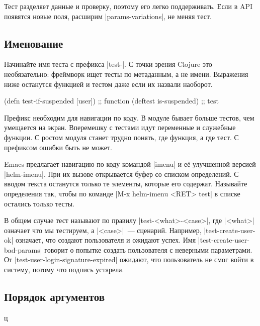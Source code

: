 Тест разделяет данные и проверку, поэтому его легко поддерживать. Если в API
появятся новые поля, расширим \spverb|params-variations|, не меняя тест.

\subsection{Именование}


Начинайте имя теста с префикса \spverb|test-|. С точки зрения Clojure это
необязательно: фреймворк ищет тесты по метаданным, а не имени. Выражения ниже
останутся функцией и тестом даже если их назвали наоборот.

\begin{english}
  \begin{clojure}
(defn test-if-suspended [user]) ;; function
(deftest is-suspended)          ;; test
  \end{clojure}
\end{english}

Префикс необходим для навигации по коду. В модуле бывает больше тестов, чем
умещается на экран. Вперемешку с тестами идут переменные и служебные функции. С
ростом модуля станет трудно понять, где функция, а где тест. С префиксом ошибки
быть не может.


Emacs предлагает навигацию по коду командой \spverb|imenu| и е\"{е} улучшенной
версией \spverb|helm-imenu|. При их вызове открывается буфер со списком
определений. С вводом текста останутся только те элементы, которые его
содержат. Называйте определения так, чтобы по команде \spverb|M-x helm-imenu <RET> test|
в списке остались только тесты.

В общем случае тест называют по правилу \spverb|test-<what>-<case>|, где
\spverb|<what>| означает что мы тестируем, а \spverb|<case>|~---
сценарий. Например, \spverb|test-create-user-ok| означает, что создают
пользователя и ожидают успех. Имя \spverb|test-create-user-bad-params| говорит о
попытке создать пользователя с неверными параметрами. От
\spverb|test-user-login-signature-expired| ожидают, что пользователь не смог
войти в систему, потому что подпись устарела.

\subsection{Порядок аргументов}

ц

